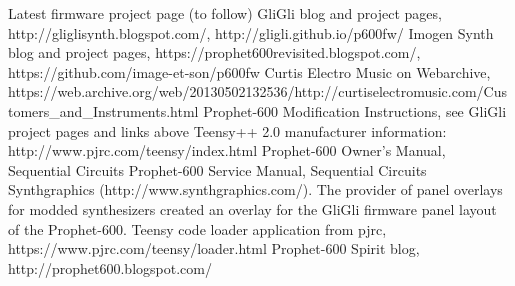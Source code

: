 \documentclass[landscape, 11pt, oneside, twoside]{report}
\begin{document}
\begin{thebibliography}{50} 

Latest firmware project page (to follow)
GliGli blog and project pages, http://gliglisynth.blogspot.com/, http://gligli.github.io/p600fw/
Imogen Synth blog and project pages, https://prophet600revisited.blogspot.com/, https://github.com/image-et-son/p600fw
Curtis Electro Music on Webarchive, https://web.archive.org/web/20130502132536/http://curtiselectromusic.com/Customers\_and\_Instruments.html
 Prophet-600 Modification Instructions, see GliGli project pages and links above
Teensy++ 2.0 manufacturer information: http://www.pjrc.com/teensy/index.html
Prophet-600 Owner's Manual, Sequential Circuits
 Prophet-600 Service Manual, Sequential Circuits
 Synthgraphics (http://www.synthgraphics.com/). The provider of panel overlays for modded synthesizers created an overlay for the GliGli firmware panel layout of the Prophet-600.
 Teensy code loader application from pjrc, https://www.pjrc.com/teensy/loader.html
Prophet-600 Spirit blog, http://prophet600.blogspot.com/

\end{thebibliography}
\end{document}
